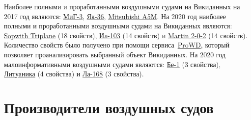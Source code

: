 
Наиболее полными и проработанными воздушными судами на Викиданных на 2017 год являются: \href{https://www.wikidata.org/wiki/Q271446}{МиГ-3}, \href{https://www.wikidata.org/wiki/Q1349098}{Як-36}, \href{https://www.wikidata.org/wiki/Q429839}{Mitsubishi A5M}. На 2020 год наиболее полными и проработанными воздушными судами на Викиданных являются: \href{https://www.wikidata.org/wiki/Q770863}{Sopwith Triplane} (18 свойств), \href{https://www.wikidata.org/wiki/Q1658673}{Ил-103} (14 свойств) и \href{https://www.wikidata.org/wiki/Q665071}{Martin 2-0-2} (14 свойств).
Количество свойств было получено 
при помощи сервиса~\href{https://prowd.id/dashboards/972cd00ce110/profile}{ProWD}\autocite{aircraft_prowd}, 
который позволяет проанализировать выбранный объект Викиданных.
На 2020 год малоинформативными воздушными судами являются: \href{https://www.wikidata.org/wiki/Q820603}{Бе-1} (3 свойства), \href{https://www.wikidata.org/wiki/Q117984}{Литуаника} (4 свойства) и \href{https://www.wikidata.org/wiki/Q572762}{Ла-168} (3 свойства).



\section{Производители воздушных судов}%

